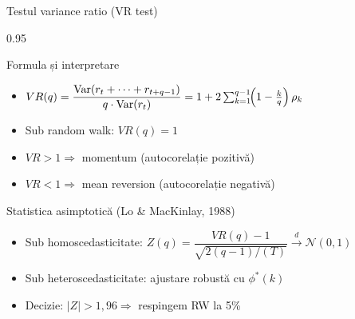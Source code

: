 \documentclass[9pt, aspectratio=169, t]{beamer}
\begin{document}
\begin{frame}[shrink=15]{Testul variance ratio (VR test)}
\begin{cminipage}{0.95\textwidth}
\begin{block}{Formula și interpretare}
\begin{itemize}\setlength{\itemsep}{0pt}
    \item $VR(q) = \dfrac{\text{Var}(r_t + \cdots + r_{t+q-1})}{q \cdot \text{Var}(r_t)} = 1 + 2\sum_{k=1}^{q-1}\!\!\left(1 - \tfrac{k}{q}\right)\rho_k$
    \item Sub random walk: $VR(q) = 1$
    \item $VR > 1 \Rightarrow$ momentum (autocorelație pozitivă)
    \item $VR < 1 \Rightarrow$ mean reversion (autocorelație negativă)
\end{itemize}
\end{block}

\begin{exampleblock}{Statistica asimptotică (Lo \& MacKinlay, 1988)}
\begin{itemize}\setlength{\itemsep}{0pt}
    \item Sub homoscedasticitate: $Z(q) = \dfrac{VR(q) - 1}{\sqrt{2(q-1)/(T)}} \xrightarrow{d} \mathcal{N}(0, 1)$
    \item Sub heteroscedasticitate: ajustare robustă cu $\phi^*(k)$
    \item Decizie: $|Z| > 1{,}96 \Rightarrow$ respingem RW la 5\%
\end{itemize}
\end{exampleblock}
\end{cminipage}
\end{frame}
\end{document}
